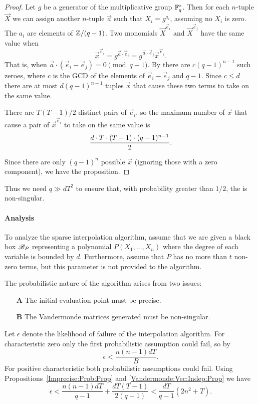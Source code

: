 \begin{proof}
Let $g$ be a generator of the multiplicative group $\mathbb{F}_q^{\ast}$.  Then
for each $n$-tuple $\vec X$ we can assign another $n$-tuple $\vec a$ such that
$X_i = g^{a_i}$, assuming no $X_i$ is zero.  The $a_i$ are elements of
$\mathbb{Z}/(q-1)$.  Two monomials $\vec X^{\vec e_i}$ and $\vec X^{\vec e_j}$ have the
same value when 
\[
\vec x^{\vec e_i} = g^{\vec a \cdot \vec e_i} = g^{\vec a \cdot \vec e_j}
\vec x^{\vec e_j}.
\]
That is, when $\vec a \cdot (\vec e_i - \vec e_j) = 0 \pmod{q-1}$.  By
 there are $c (q -1)^{n-1}$ such zeroes,
where $c$ is the GCD of the elements of $\vec e_i - \vec e_j$ and $q-1$.
Since $c \le d$ there are at most $d (q -1)^{n-1}$ tuples $\vec x$ that
cause these two terms to take on the same value.

There are $T(T-1)/2$ distinct pairs of $\vec e_i$, so the maximum number of
$\vec x$ that cause a pair of $\vec x^{\vec e_i}$ to take on the same value is
\[
{d \cdot T \cdot (T-1) \cdot (q-1)^{n-1} \over 2}.
\]

Since there are only $(q-1)^{n}$ possible $\vec x$ (ignoring those
with a zero component), we have the proposition.
\end{proof}

Thus we need $q \gg dT^2$ to ensure that, with probability greater than 
$1/2$, the  is non-singular.  

\paragraph{Analysis}

To analyze the sparse interpolation algorithm, assume that we are given a
black box ${\cal B}_P$ representing a polynomial $P(X_1, \ldots, X_n)$
where the degree of each variable is bounded by $d$.  Furthermore, assume
that $P$ has no more than $t$ non-zero terms, but this parameter is not
provided to the algorithm.  

The probabilistic nature of the algorithm arises from two issues:
\begin{itemize}
\item[{\bf A}] The initial evaluation point must be precise.
\item[{\bf B}] The Vandermonde matrices generated must be non-singular. 
\end{itemize}

Let $\epsilon$ denote the likelihood of failure of the interpolation
algorithm.  For characteristic zero only the first probabilistic
assumption could fail, so by 
\[
\epsilon < \frac{n(n-1)dT}{B}.
\]
For positive characteristic both probabilistic assumptions could fail.
Using Propositions~\ref{Imprecise:Prob:Prop} and
\ref{Vandermonde:Vec:Indep:Prop} we have
\[
\epsilon < \frac{n(n-1)dT}{q-1} + \frac{dT(T-1)}{2(q-1)} <
\frac{dT}{q-1}(2n^2 +T).
\]

